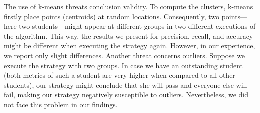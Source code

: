 The use of k-means threats conclusion validity. To compute the clusters, k-means firstly place points (centroids) at random locations. Consequently, two points---here two students---might appear at different groups in two different executions of the algorithm. This way, the results we present for precision, recall, and accuracy might be different when executing the strategy again. However, in our experience, we report only slight differences. Another threat concerns outliers. Suppose we execute the strategy with two groups. In case we have an outstanding student (both metrics of such a student are very higher when compared to all other students), our strategy might conclude that she will pass and everyone else will fail, making our strategy negatively susceptible to outliers. Nevertheless, we did not face this problem in our findings.
